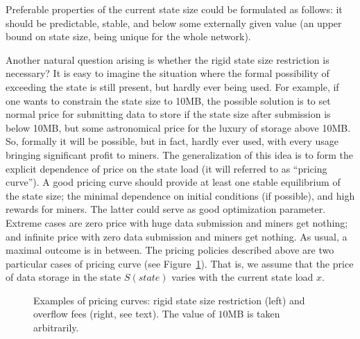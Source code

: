 \documentclass[]{llncs}   %
\begin{document}
Preferable properties of the current state size could be formulated as follows:
it should be predictable, stable, and below some externally given value (an upper
bound on state size, being unique for the whole network). 

Another natural question arising is whether the rigid state size restriction is
necessary?  It is easy to imagine the situation where the formal possibility of
exceeding the state is still present, but hardly ever being used. For example,
if one wants to constrain the state size to 10MB, the possible solution is to
set normal price for submitting data to store if the state size after submission
is below 10MB, but some astronomical price for the luxury of storage above 10MB.
So, formally it will be possible, but in fact, hardly ever used, with every
usage bringing significant profit to miners. The generalization of this idea is
to form the explicit dependence of price on the state load (it will referred to
as ``pricing curve''). A good pricing curve should provide at least one stable
equilibrium of the state size; the minimal dependence on initial conditions (if
possible), and high rewards for miners. The latter could serve as good
optimization parameter. Extreme cases are zero price with huge data submission and
miners get nothing; and infinite price with zero data submission and miners get
nothing. As usual, a maximal outcome is in between.  The pricing policies
described above are two particular cases of pricing curve (see
Figure~\ref{fig:steps}). That is, we assume that the price of data storage in the
state $S(state)$ varies with the current state load $x$. 
\begin{figure}[h]
    \hfill 
    \hfill 
    \hfill 
    \caption{ 
        Examples of pricing curves: rigid state size restriction (left) and 
        overflow fees (right, see text). The value of $10$MB is taken 
        arbitrarily.  
    } 
    \label{fig:steps}
\end{figure} 
\end{document}
